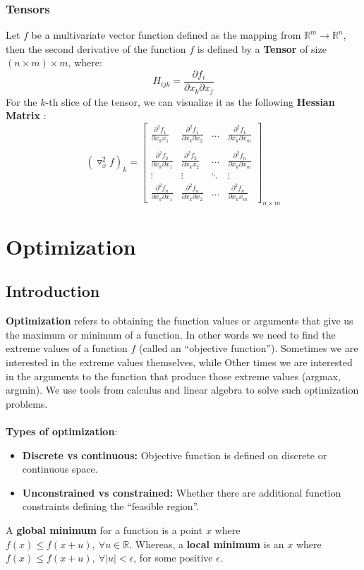 \documentclass[12pt, a4paper]{book}
\begin{document}
\subsection{Tensors}
Let $f$ be a multivariate vector function defined as the mapping from $\mathbb{R}^m \to \mathbb{R}^n$, then the second derivative of the function $f$ is defined by a \textbf{Tensor} of size $(n\times m) \times m$, where:
$$H_{ijk} = \frac{\partial f_i}{\partial x_k \partial x_j}$$
For the $k$-th slice of the tensor, we can visualize it as the following \textbf{Hessian Matrix} :
$$(\triangledown^2_xf)_k = \begin{bmatrix}
    \frac{\partial^2 f_1}{\partial x_kx_1} & \frac{\partial^2 f_1}{\partial x_k\partial x_2} & \ldots & \frac{\partial^2 f_1}{\partial x_k\partial x_m}\\\\
    \frac{\partial^2 f_2}{\partial x_k\partial x_1} & \frac{\partial^2 f_2}{\partial x_kx_2} & \ldots & \frac{\partial^2 f_n}{\partial x_k\partial x_m}\\
    \vdots & \vdots & \ddots & \vdots\\
    \frac{\partial^2 f_n}{\partial x_k\partial x_1} & \frac{\partial^2 f_n}{\partial x_k\partial x_2} & \ldots & \frac{\partial^2 f_n}{\partial x_kx_m}
\end{bmatrix}_{n \times m}$$


\newpage


\chapter{Optimization}
\section{Introduction}
\textbf{Optimization} refers to obtaining the function values or arguments that give us the maximum or minimum of a function. In other words we need to find the extreme values of a function $f$ (called an “objective function”). Sometimes we are interested in the extreme values themselves, while Other times we are interested in the arguments to the function that produce those extreme values (argmax, argmin). We use tools from calculus and linear algebra to solve such optimization problems.\\\\
\textbf{Types of optimization}:
\begin{itemize}
    \item \textbf{Discrete vs continuous:} Objective function is defined on discrete or continuous space.
    \item \textbf{Unconstrained vs constrained:} Whether there are additional function constraints defining the “feasible region”.\\
\end{itemize}
A \textbf{global minimum} for a function is a point $x$
where $f(x) \leq f(x+u), \ \forall u \in \mathbb{R}$. Whereas, a \textbf{local minimum} is an $x$ where $f(x) \leq f(x+u), \ \forall |u|< \epsilon$, for some positive $\epsilon$.
\end{document}
